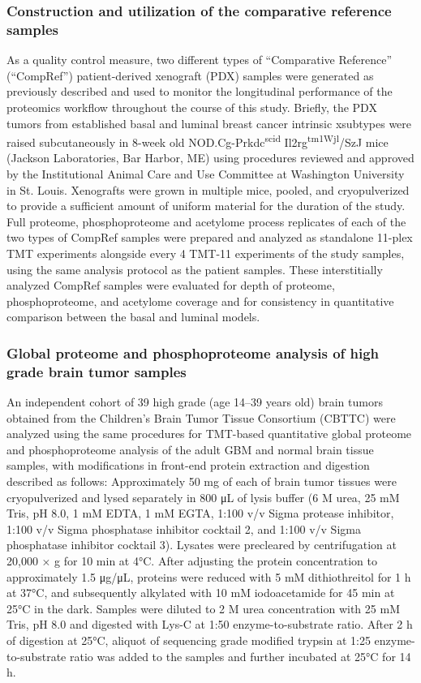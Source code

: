 \subsubsection{Construction and utilization of the comparative reference samples}
As a quality control measure, two different types of ``Comparative Reference'' (``CompRef'') patient-derived xenograft (PDX) samples were generated as previously described \cite{lis_ellismj:EndocrinetherapyresistantESR12013,tabbdl_lieblerdc:ReproducibilityDifferential2016} and used to monitor the longitudinal performance of the proteomics workflow throughout the course of this study. Briefly, the PDX tumors from established basal and luminal breast cancer intrinsic xsubtypes were raised subcutaneously in 8-week old NOD.Cg-Prkdc\textsuperscript{scid} Il2rg\textsuperscript{tm1Wjl}/SzJ mice (Jackson Laboratories, Bar Harbor, ME) using procedures reviewed and approved by the Institutional Animal Care and Use Committee at Washington University in St. Louis. Xenografts were grown in multiple mice, pooled, and cryopulverized to provide a sufficient amount of uniform material for the duration of the study. Full proteome, phosphoproteome and acetylome process replicates of each of the two types of CompRef samples were prepared and analyzed as standalone 11-plex TMT experiments alongside every 4 TMT-11 experiments of the study samples, using the same analysis protocol as the patient samples. These interstitially analyzed CompRef samples were evaluated for depth of proteome, phosphoproteome, and acetylome coverage and for consistency in quantitative comparison between the basal and luminal models.

\subsubsection{Global proteome and phosphoproteome analysis of high grade brain tumor samples}
An independent cohort of 39 high grade (age 14--39 years old) brain tumors obtained from the Children’s Brain Tumor Tissue Consortium (CBTTC) were analyzed using the same procedures for TMT-based quantitative global proteome and phosphoproteome analysis of the adult GBM and normal brain tissue samples, with modifications in front-end protein extraction and digestion described as follows: Approximately 50 mg of each of brain tumor tissues were cryopulverized and lysed separately in 800 μL of lysis buffer (6 M urea, 25 mM Tris, pH 8.0, 1 mM EDTA, 1 mM EGTA, 1:100 v/v Sigma protease inhibitor, 1:100 v/v Sigma phosphatase inhibitor cocktail 2, and 1:100 v/v Sigma phosphatase inhibitor cocktail 3). Lysates were precleared by centrifugation at 20,000 × g for 10 min at 4°C. After adjusting the protein concentration to approximately 1.5 μg/μL, proteins were reduced with 5 mM dithiothreitol for 1 h at 37°C, and subsequently alkylated with 10 mM iodoacetamide for 45 min at 25°C in the dark. Samples were diluted to 2 M urea concentration with 25 mM Tris, pH 8.0 and digested with Lys-C at 1:50 enzyme-to-substrate ratio. After 2 h of digestion at 25°C, aliquot of sequencing grade modified trypsin at 1:25 enzyme-to-substrate ratio was added to the samples and further incubated at 25°C for 14 h.


